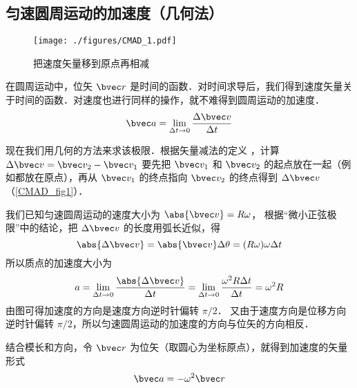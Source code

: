 

\subsection{匀速圆周运动的加速度（几何法）}

\begin{figure}[ht]
\centering
\texttt{[image: ./figures/CMAD\_1.pdf]}
\caption{把速度矢量移到原点再相减}\label{CMAD_fig1}
\end{figure}

在圆周运动中，位矢 $\bvec r$ 是时间的函数．对时间求导后，我们得到速度矢量关于时间的函数．对速度也进行同样的操作，就不难得到圆周运动的加速度．
\begin{equation}
\bvec a = \lim_{\Delta t \to 0} \frac{\Delta \bvec v}{\Delta t}
\end{equation}

现在我们用几何的方法来求该极限．根据矢量减法的定义%
，计算 $\Delta \bvec v = \bvec v_2 - \bvec v_1$ 要先把 $\bvec v_1$ 和 $\bvec v_2$ 的起点放在一起（例如都放在原点），再从 $\bvec v_1$ 的终点指向 $\bvec v_2$ 的终点得到 $\Delta \bvec v$ （\autoref{CMAD_fig1}）． 

我们已知匀速圆周运动的速度大小为 $\abs{\bvec v} = R\omega$， 根据“微小正弦极限”中的结论，把 $\Delta\bvec v$ 的长度用弧长近似，得
\begin{equation}
\abs{\Delta \bvec v} = \abs{\bvec v}\Delta \theta  = (R\omega)\omega \Delta t
\end{equation}
所以质点的加速度大小为
\begin{equation}
a =\lim_{\Delta t \to 0} \frac{\abs{\Delta \bvec v}}{\Delta t} =  \lim_{\Delta t \to 0} \frac{\omega ^2 R \Delta t}{\Delta t} = \omega ^2 R
\end{equation}
由图可得加速度的方向是速度方向逆时针偏转 $\pi/2$． 又由于速度方向是位移方向逆时针偏转 $\pi/2$，所以匀速圆周运动的加速度的方向与位矢的方向相反．

结合模长和方向，令 $\bvec r$ 为位矢（取圆心为坐标原点），就得到加速度的矢量形式
\begin{equation}\label{CMAD_eq4}
\bvec a =  - \omega ^2 \bvec r
\end{equation}

